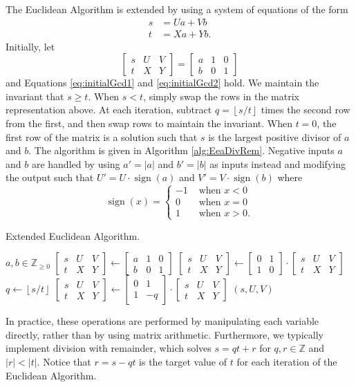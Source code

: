 \documentclass{ucalgthes1}
\theoremstyle{definition}
\DeclareMathOperator{\sign}{sign}
\newcommand{\ZZ}{\mathbb{Z}}
\newcommand{\ZZgez}{\mathbb{Z}_{\ge 0}}
\newcommand{\matrixtt}[4]{\left[ \begin{array}{rr} #1 & #2 \\ #3 & #4 \end{array} \right]}
\newcommand{\matrixThreeTwo}[6]{\left[ \begin{array}{rrr} #1 & #2 & #3 \\ #4 & #5 & #6 \end{array} \right]}
\newcommand{\floor}[1]{\left\lfloor #1 \right\rfloor}
\begin{document}
The Euclidean Algorithm is extended by using a system of equations of the form
\begin{align}
s &= Ua + Vb \label{eq:initialGcd1} \\
t &= Xa + Yb. \label{eq:initialGcd2}
\end{align}
Initially, let
\[
\matrixThreeTwo{s}{U}{V}{t}{X}{Y} = \matrixThreeTwo{a}{1}{0}{b}{0}{1}
\]
and Equations \ref{eq:initialGcd1} and \ref{eq:initialGcd2} hold.  We maintain the invariant that $s \ge t$.  When $s < t$, simply swap the rows in the matrix representation above.  At each iteration, subtract $q = \floor{s/t}$ times the second row from the first, and then swap rows to maintain the invariant.  When $t=0$, the first row of the matrix is a solution such that $s$ is the largest positive divisor of $a$ and $b$.  The algorithm is given in Algorithm \ref{alg:EeaDivRem}.  Negative inputs $a$ and $b$ are handled by using $a' = |a|$ and $b' = |b|$ as inputs instead and modifying the output such that $U' = U \cdot \sign(a)$ and $V' = V \cdot \sign(b)$ where
\[
	\sign(x) = \begin{cases}
		-1 & \textrm{ when } x < 0 \\
		0 & \textrm{ when } x = 0 \\
		1 & \textrm{ when } x > 0.
	\end{cases}
\]

\begin{algorithm}[htb]
\caption{Extended Euclidean Algorithm.}
\label{alg:EeaDivRem}
\begin{algorithmic}[1]
\Require $a,b \in \ZZgez$
\State $\matrixThreeTwo{s}{U}{V}{t}{X}{Y} \gets 
        \matrixThreeTwo{a}{1}{0}{b}{0}{1}$
	\State $\matrixThreeTwo{s}{U}{V}{t}{X}{Y} \gets
	        \matrixtt{0}{1}{1}{0} \cdot \matrixThreeTwo{s}{U}{V}{t}{X}{Y}$
\EndIf
{}
	\State $q \gets \floor{s / t}$
	\State $\matrixThreeTwo{s}{U}{V}{t}{X}{Y} \gets \matrixtt{0}{1}{1}{-q} \cdot
		    \matrixThreeTwo{s}{U}{V}{t}{X}{Y}$ 
\EndWhile
\State \Return $(s, U, V)$ 
\end{algorithmic}
\end{algorithm}

In practice, these operations are performed by manipulating each variable directly, rather than by using matrix arithmetic.  Furthermore, we typically implement division with remainder, which solves $s = qt + r$ for $q,r \in \ZZ$ and $|r| < |t|$.  Notice that $r = s - qt$ is the target value of $t$ for each iteration of the Euclidean Algorithm.
\end{document}
